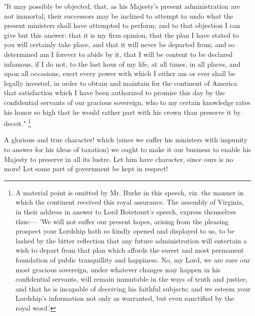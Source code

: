 "It may possibly be objected, that, as his Majesty's present administration are not immortal, their successors may be inclined to attempt to undo what the present ministers shall have attempted to perform; and to that objection I can give but this answer: that it is my firm opinion, that the plan I have stated to you will certainly take place, and that it will never be departed from; and so determined am I forever to abide by it, that I will be content to be declared infamous, if I do not, to the last hour of my life, at all times, in all places, and upon all occasions, exert every power with which I either am or ever shall be legally invested, in order to obtain and maintain for the continent of America that satisfaction which I have been authorized to promise this day by the confidential servants of our gracious sovereign, who to my certain knowledge rates his honor so high that he would rather part with his crown than preserve it by deceit."
\footnote{A material point is omitted by Mr. Burke in this speech, viz. the manner in which the continent received this royal assurance. The assembly of Virginia, in their address in answer to Lord Botetourt's speech, express themselves thus:— 'We will not suffer our present hopes, arising from the pleasing prospect your Lordship hath so kindly opened and displayed to us, to be lashed by the bitter reflection that any future administration will entertain a wish to depart from that plan which affords the surest and most permanent foundation of public tranquillity and happiness. No, my Lord, we are sure our most gracious sovereign, under whatever changes may happen in his confidential servants, will remain immutable in the ways of truth and justice, and that he is incapable of deceiving his faithful subjects; and we esteem your Lordship's information not only as warranted, but even sanctified by the royal word.'  }

A glorious and true character! which (since we suffer his ministers with impunity to answer for his ideas of taxation) we ought to make it our business to enable his Majesty to preserve in all its lustre. Let him have character, since ours is no more! Let some part of government be kept in respect!

